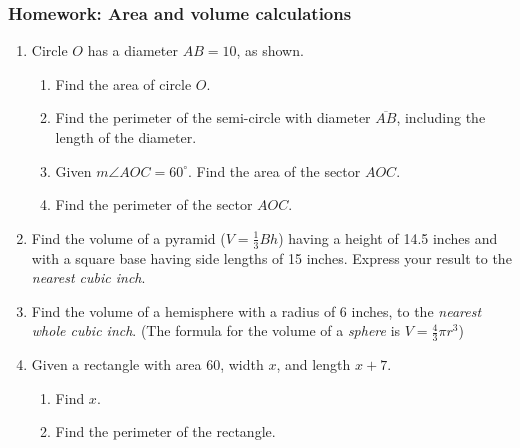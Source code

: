 \documentclass[12pt, twoside]{article}
\begin{document}
\subsubsection*{Homework: Area and volume calculations}
 \begin{enumerate}

 \item Circle $O$ has a diameter $AB=10$, as shown.
       \begin{center}
     \end{center}
     \begin{enumerate}
       \item Find the area of circle $O$. \vspace{2.5cm}
       \item Find the perimeter of the semi-circle with diameter $\overline{AB}$, including the length of the diameter. \vspace{2.5cm}
       \item Given $m\angle AOC=60^\circ$. Find the area of the sector $AOC$. \vspace{2.5cm}
       \item Find the perimeter of the sector $AOC$.
     \end{enumerate}

\newpage

\item Find the volume of a pyramid ($V=\frac{1}{3}Bh$) having a height of 14.5 inches and with a square base having side lengths of 15 inches. Express your result to the \emph{nearest cubic inch}. \vspace{5cm}

\item Find the volume of a hemisphere with a radius of 6 inches, to the \emph{nearest whole cubic inch}. (The formula for the volume of a \emph{sphere} is $V=\frac{4}{3}\pi r^3$)  \vspace{5cm}

\item Given a rectangle with area 60, width $x$, and length $x+7$.
  \begin{enumerate}
    \item Find $x$. \vspace{4cm}
    \item Find the perimeter of the rectangle.
  \end{enumerate}

\end{enumerate}
\end{document}
